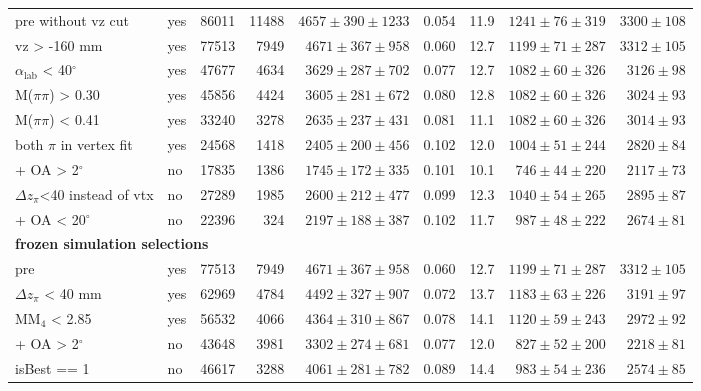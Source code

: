 \begin{table}[H]
\begin{tabular}{llrrrrrrr}
pre without vz cut & yes & 86011 & 11488 & $4657\pm390\pm1233$ & 0.054 & 11.9 & $1241\pm76\pm319$ & $3300\pm108$ \\
vz > -160 mm & yes & 77513 & 7949 & $4671\pm367\pm958$ & 0.060 & 12.7 & $1199\pm71\pm287$ & $3312\pm105$ \\
$\alpha_\mathrm{lab}$ < 40$^\circ$ & yes & 47677 & 4634 & $3629\pm287\pm702$ & 0.077 & 12.7 & $1082\pm60\pm326$ & $3126\pm98$ \\
M($\pi\pi$) > 0.30 & yes & 45856 & 4424 & $3605\pm281\pm672$ & 0.080 & 12.8 & $1082\pm60\pm326$ & $3024\pm93$ \\
M($\pi\pi$) < 0.41 & yes & 33240 & 3278 & $2635\pm237\pm431$ & 0.081 & 11.1 & $1082\pm60\pm326$ & $3014\pm93$ \\
both $\pi$ in vertex fit & yes & 24568 & 1418 & $2405\pm200\pm456$ & 0.102 & 12.0 & $1004\pm51\pm244$ & $2820\pm84$ \\
+ OA > 2$^\circ$ & no & 17835 & 1386 & $1745\pm172\pm335$ & 0.101 & 10.1 & $746\pm44\pm220$ & $2117\pm73$ \\
$\Delta z_\pi$<40 instead of vtx & no & 27289 & 1985 & $2600\pm212\pm477$ & 0.099 & 12.3 & $1040\pm54\pm265$ & $2895\pm87$ \\
+ OA < 20$^\circ$ & no & 22396 & 324 & $2197\pm188\pm387$ & 0.102 & 11.7 & $987\pm48\pm222$ & $2674\pm81$ \\
\midrule
\multicolumn{9}{l}{\textbf{frozen simulation selections}} \\
pre & yes & 77513 & 7949 & $4671\pm367\pm958$ & 0.060 & 12.7 & $1199\pm71\pm287$ & $3312\pm105$ \\
$\Delta z_\pi$ < 40 mm & yes & 62969 & 4784 & $4492\pm327\pm907$ & 0.072 & 13.7 & $1183\pm63\pm226$ & $3191\pm97$ \\
MM$_4$ < 2.85 & yes & 56532 & 4066 & $4364\pm310\pm867$ & 0.078 & 14.1 & $1120\pm59\pm243$ & $2972\pm92$ \\
+ OA > 2$^\circ$ & no & 43648 & 3981 & $3302\pm274\pm681$ & 0.077 & 12.0 & $827\pm52\pm200$ & $2218\pm81$ \\
isBest == 1 & no & 46617 & 3288 & $4061\pm281\pm782$ & 0.089 & 14.4 & $983\pm54\pm236$ & $2574\pm85$ \\
\bottomrule
\end{tabular}
\end{table}
